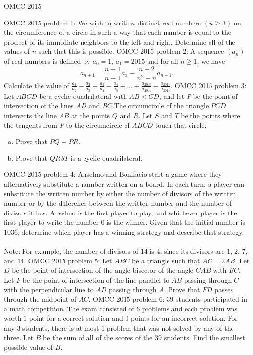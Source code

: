 OMCC 2015 

OMCC 2015 problem 1:  We wish to write $n$ distinct real numbers $(n\geq3)$ on the circumference of a circle in such a way that each number is equal to the product of its immediate neighbors to the left and right. Determine all of the values of $n$ such that this is possible. 
OMCC 2015 problem 2:  A sequence $(a_n)$ of real numbers is defined by $a_0=1$, $a_1=2015$ and for all $n\geq1$, we have
\[ a_{n+1}=\frac{n-1}{n+1}a_n-\frac{n-2}{n^2+n}a_{n-1}. \]
Calculate the value of $\frac{a_1}{a_2}-\frac{a_2}{a_3}+\frac{a_3}{a_4}-\frac{a_4}{a_5}+\ldots+\frac{a_{2013}}{a_{2014}}-\frac{a_{2014}}{a_{2015}}$. 
OMCC 2015 problem 3:  Let $ABCD$ be a cyclic quadrilateral with $AB<CD$, and let $P$ be the point of intersection of the lines $AD$ and $BC$.The circumcircle of the triangle $PCD$ intersects the line $AB$ at the points $Q$ and $R$. Let $S$ and $T$ be the points where the tangents from $P$ to the circumcircle of $ABCD$ touch that circle.
\begin{enumerate}[(a)]
  \item Prove that $PQ=PR$.
  \item Prove that $QRST$ is a cyclic quadrilateral.
\end{enumerate} 
OMCC 2015 problem 4:  Anselmo and Bonifacio start a game where they alternatively substitute a number written on a board. In each turn, a player can substitute the written number by either the number of divisors of the written number or by the difference between the written number and the number of divisors it has. Anselmo is the first player to play, and whichever player is the first player to write the number $0$ is the winner. Given that the initial number is $1036$, determine which player has a winning strategy and describe that strategy. \\\\
Note: For example, the number of divisors of $14$ is $4$, since its divisors are $1$, $2$, $7$, and $14$. 
OMCC 2015 problem 5:  Let $ABC$ be a triangle such that $AC=2AB$. Let $D$ be the point of intersection of the angle bisector of the angle $CAB$ with $BC$. Let $F$ be the point of intersection of the line parallel to $AB$ passing through $C$ with the perpendicular line to $AD$ passing through $A$. Prove that $FD$ passes through the midpoint of $AC$. 
OMCC 2015 problem 6:  $39$ students participated in a math competition. The exam consisted of $6$ problems and each problem was worth $1$ point for a correct solution and $0$ points for an incorrect solution. For any $3$ students, there is at most $1$ problem that was not solved by any of the three. Let $B$ be the sum of all of the scores of the $39$ students. Find the smallest possible value of $B$. 

